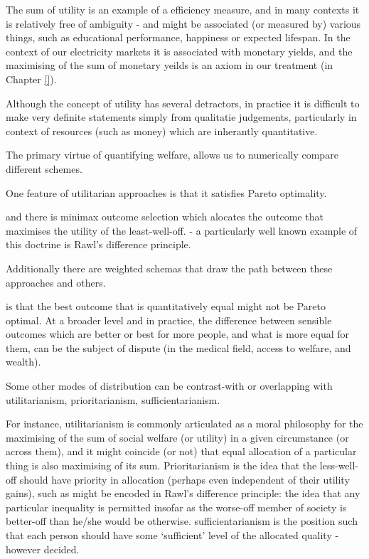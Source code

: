 The sum of utility is an example of a efficiency measure, and in many contexts it is relatively free of ambiguity - and might be associated (or measured by) various things, such as educational performance, happiness or expected lifespan.
In the context of our electricity markets it is associated with monetary yields, and the maximising of the sum of monetary yeilds is an axiom in our treatment (in Chapter \ref{}).





Although the concept of utility has several detractors, in practice it is difficult to make very definite statements simply from qualitatie judgements, particularly in context of resources (such as money) which are inherantly quantitative.

The primary virtue of quantifying welfare, allows us to numerically compare different schemes.


One feature of utilitarian approaches is that it satisfies Pareto optimality.


and there is minimax outcome selection which alocates the outcome that maximises the utility of the least-well-off.
- a particularly well known example of this doctrine is Rawl's difference principle.

Additionally there are weighted schemas that draw the path between these approaches and others.

 


is that the best outcome that is quantitatively equal might not be Pareto optimal.
At a broader level and in practice, the difference between sensible outcomes which are better or best for more people, and what is more equal for them, can be the subject of dispute (in the medical field, access to welfare, and wealth).







Some other modes of distribution can be contrast-with or overlapping with utilitarianism, prioritarianism, sufficientarianism.

For instance, utilitarianism is commonly articulated as a moral philosophy for the maximising of the sum of social welfare (or utility) in a given circumstance (or across them), and it might coincide (or not) that equal allocation of a particular thing is also maximising of its sum.
Prioritarianism is the idea that the less-well-off should have priority in allocation (perhaps even independent of their utility gains), such as might be encoded in Rawl's difference principle: the idea that any particular inequality is permitted insofar as the worse-off member of society is better-off than he/she would be otherwise.
sufficientarianism is the position such that each person should have some `sufficient' level of the allocated quality - however decided.

